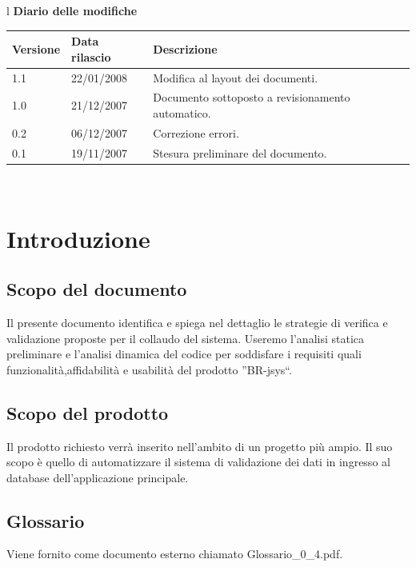 \documentclass[11pt,titlepage,a4paper]{report}
\begin{document}
\begin{center}
\begin{table}[hbtp]
\large{
\begin{tabular}{l}
\Large{\textbf{\textsf{Diario delle modifiche}}} \\
\begin{tabular}{||p{2cm}||p{3.5cm}||p{6cm}||}
\hline
\textbf{Versione} & \textbf{Data rilascio} & \textbf{Descrizione} \\ \hline
1.1 & 22/01/2008 & Modifica al layout dei documenti.\\ \hline
1.0 & 21/12/2007 & Documento sottoposto a revisionamento automatico.\\ \hline
0.2 & 06/12/2007 & Correzione errori. \\ \hline
0.1 & 19/11/2007 & Stesura preliminare del documento. \\ \hline
\end{tabular} \\
\end{tabular}

}
\end{table}
\end{center}

\tableofcontents	%

\chapter{Introduzione}
\section{Scopo del documento}
Il presente documento identifica e spiega nel dettaglio le strategie di verifica e validazione proposte per il collaudo del sistema. Useremo l'analisi statica preliminare e l'analisi dinamica del codice per soddisfare i requisiti quali funzionalit\`a,affidabilit\`a e usabilit\`a del prodotto ''BR-jsys``.

\section{Scopo del prodotto}
Il prodotto richiesto verr\`a inserito nell'ambito di un progetto pi\`u ampio. Il suo scopo \`e quello di automatizzare il sistema di validazione dei dati in ingresso al database dell'applicazione principale.

\section{Glossario}
Viene fornito come documento esterno chiamato Glossario\_0\_4.pdf.
\end{document}
